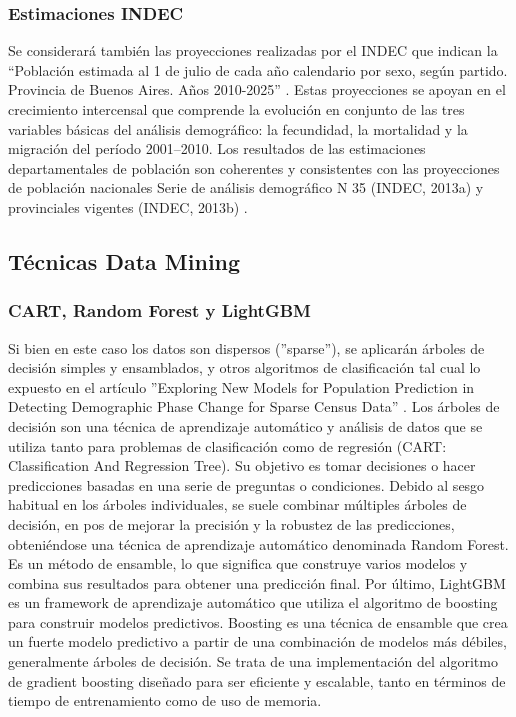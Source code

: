 \documentclass{article}
\theoremstyle{mytheoremstyle}
\theoremstyle{mytheoremstyle}
\theoremstyle{myproblemstyle}
\begin{document}
\subsubsection{Estimaciones INDEC}
 Se considerará también las proyecciones realizadas por el INDEC que indican la “Población estimada al 1 de julio de
 cada año calendario por sexo, según partido. Provincia de Buenos Aires. Años 2010-2025” .\newline\newline
  Estas proyecciones se apoyan en el crecimiento intercensal que comprende la evolución en conjunto
 de las tres variables básicas del análisis demográfico: la fecundidad, la mortalidad y la migración del período
 2001--2010. Los resultados de las estimaciones departamentales de población son coherentes y consistentes
 con las proyecciones de población nacionales Serie de análisis demográfico N 35 (INDEC, 2013a) y
 provinciales vigentes (INDEC, 2013b) .

\subsection{Técnicas Data Mining}

\subsubsection{CART, Random Forest  y LightGBM}
 Si bien en este caso los datos son dispersos (''sparse''), se aplicarán árboles de decisión simples y ensamblados, y otros algoritmos de clasificación
 tal cual lo expuesto en el artículo ''Exploring New Models for Population Prediction in Detecting Demographic
  Phase Change for Sparse Census Data'' . \newline\newline
  Los árboles de decisión son una técnica de aprendizaje automático y análisis de datos que se utiliza tanto
   para problemas de clasificación como de regresión (CART: Classification And Regression Tree).  Su objetivo es tomar decisiones o
  hacer predicciones basadas en una serie de preguntas o condiciones.  Debido al sesgo habitual en los árboles 
  individuales, se suele combinar múltiples árboles de  decisión, en pos de mejorar la precisión y la robustez de las predicciones, 
obteniéndose una técnica de aprendizaje automático denominada Random Forest. Es un método de ensamble, lo 
  que significa que construye varios modelos y combina sus resultados para obtener una predicción final.\newline\newline
  Por último, LightGBM es un framework de aprendizaje automático que utiliza el algoritmo de 
  boosting para construir modelos predictivos. Boosting es una técnica de ensamble que crea un fuerte modelo 
  predictivo a partir de una combinación de modelos más débiles, generalmente árboles de decisión. Se trata de una implementación del 
algoritmo de gradient boosting diseñado para ser eficiente y escalable, tanto en términos de tiempo de entrenamiento como de uso de memoria.
  
\end{document}
